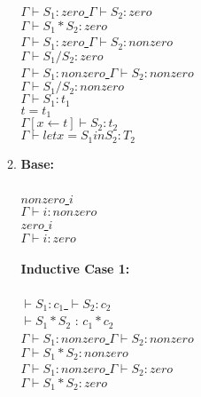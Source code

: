 \documentclass[11pt]{article}
\begin{document}
\begin{enumerate}
\begin{enumerate}
		\underline{$\Gamma\vdash S_1:zero$ \hspace{12} $\Gamma\vdash S_2:zero$}\\
		$\Gamma\vdash S_1*S_2:zero$\\
		
		\underline{$\Gamma\vdash S_1:zero$ \hspace{12} $\Gamma\vdash S_2:non zero$}\\
		$\Gamma\vdash S_1/S_2:zero$\\
		
		\underline{$\Gamma\vdash S_1:non zero$ \hspace{12} $\Gamma\vdash S_2:non zero$}\\
		$\Gamma\vdash S_1/S_2:non zero$\\
		
		$\Gamma\vdash S_1: t_1$\\
		$t = t_1$\\
		\underline{$\Gamma[x \leftarrow t]\vdash S_2:t_2$ }\\
		$\Gamma\vdash let x=S_1 in S_2:T_2$\\
	
\item  \textbf{Base:}\\
		\\
			\underline{$non zero$ $i$}\\
			$\Gamma\vdash i:non zero$\\
			
			\underline{$zero$ $i$}\\
			$\Gamma\vdash i:zero$\\
			\\
			\textbf{Inductive Case 1:}\\
			\\
			\underline{$\vdash S_1:c_1$ \hspace{12} $\vdash S_2:c_2$}\\
			$\vdash S_1*S_2$ : $c_1*c_2$\\
			
			\underline{$\Gamma\vdash S_1:non zero$ \hspace{12} $\Gamma\vdash S_2:non zero$}\\
			$\Gamma\vdash S_1*S_2:non zero$\\
		
			\underline{$\Gamma\vdash S_1:non zero$ \hspace{12} $\Gamma\vdash S_2:zero$}\\
			$\Gamma\vdash S_1*S_2:zero$\\
		

\end{enumerate}
\end{enumerate}
\end{document}
